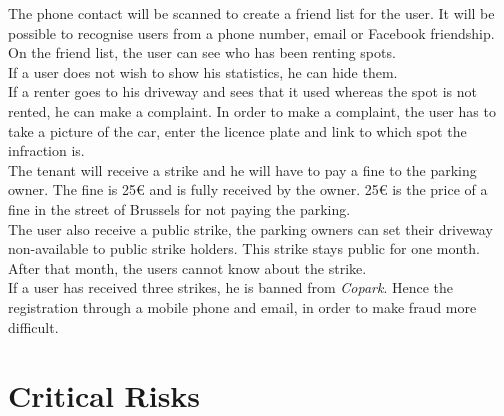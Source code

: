 \documentclass[12pt,a4paper,oneside]{book}
\newcommand{\bp}{\textit{Copark}}
\begin{document}
The phone contact will be scanned to create a friend list for the user. It will be possible to recognise users from a phone number, email or Facebook friendship. On the friend list, the user can see who has been renting spots.\\

If a user does not wish to show his statistics, he can hide them.\\

If a renter goes to his driveway and sees that it used whereas the spot is not rented, he can make a complaint. In order to make a complaint, the user has to take a picture of the car, enter the licence plate and link to which spot the infraction is.\\

The tenant will receive a strike and he will have to pay a fine to the parking owner. The fine is 25\euro{} and is fully received by the owner. 25\euro{} is the price of a fine in the street of Brussels for not paying the parking.\\

The user also receive a public strike, the parking owners can set their driveway non-available to public strike holders. This strike stays public for one month. After that month, the users cannot know about the strike.\\

If a user has received three strikes, he is banned from \bp{}. Hence the registration through a mobile phone and email, in order to make fraud more difficult.

\chapter{Critical Risks}
\label{crch}
\end{document}
